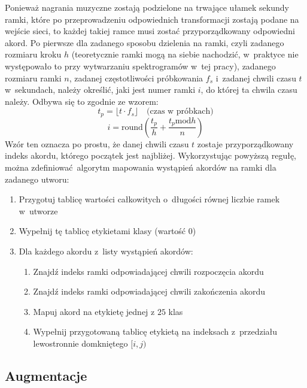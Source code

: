 Ponieważ nagrania muzyczne zostają podzielone na trwające ułamek sekundy ramki, które po przeprowadzeniu odpowiednich transformacji zostają podane na wejście sieci, to każdej takiej ramce musi zostać przyporządkowany odpowiedni akord. Po pierwsze dla zadanego sposobu dzielenia na ramki, czyli zadanego rozmiaru kroku $h$ (teoretycznie ramki mogą na siebie nachodzić, w~praktyce nie występowało to przy wytwarzaniu spektrogramów w~tej pracy), zadanego rozmiaru ramki $n$, zadanej częstotliwości próbkowania $f_s$ i~zadanej chwili czasu $t$ w~sekundach, należy określić, jaki jest numer ramki $i$, do której ta chwila czasu należy. Odbywa się to zgodnie ze wzorem:
\begin{equation}
    t_p = \lfloor t \cdot f_s \rfloor \quad \textrm{(czas w~próbkach)}
\end{equation}
\begin{equation}
    i = \textrm{round}(\frac{t_p}{h} + \frac{t_p \textrm{mod} h}{n})
\end{equation}
Wzór ten oznacza po prostu, że danej chwili czasu $t$ zostaje przyporządkowany indeks akordu, którego początek jest najbliżej. Wykorzystując powyższą regułę, można zdefiniować algorytm mapowania wystąpień akordów na ramki dla zadanego utworu:
\begin{enumerate}
    \item Przygotuj tablicę wartości całkowitych o~długości równej liczbie ramek w~utworze
    \item Wypełnij tę tablicę etykietami klasy  (wartość $0$)
    \item Dla każdego akordu z~listy wystąpień akordów:
        \begin{enumerate}
            \item Znajdź indeks  ramki odpowiadającej chwili rozpoczęcia akordu
            \item Znajdź indeks  ramki odpowiadającej chwili zakończenia akordu
            \item Mapuj akord na etykietę  jednej z $25$ klas
            \item Wypełnij przygotowaną tablicę etykietą  na indeksach z~przedziału
                lewostronnie domkniętego $[i,j)$
        \end{enumerate}
\end{enumerate}

\subsection{Augmentacje}

